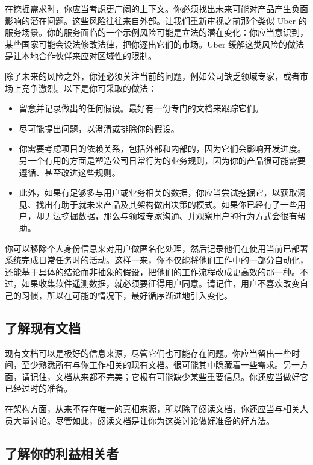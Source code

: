 \label{idx:165}
在挖掘需求时，你应当考虑更广阔的上下文。你必须找出未来可能对产品产生负面影响的潜在问题。这些风险往往来自外部。让我们重新审视之前那个类似 Uber 的服务场景。你的服务面临的一个示例风险可能是立法的潜在变化：你应当意识到，某些国家可能会设法修改法律，把你逐出它们的市场。Uber 缓解这类风险的做法是让本地合作伙伴来应对区域性的限制。

除了未来的风险之外，你还必须关注当前的问题，例如公司缺乏领域专家，或者市场上竞争激烈。以下是你可采取的做法：

\begin{itemize}
\item 留意并记录做出的任何假设。最好有一份专门的文档来跟踪它们。
\item 尽可能提出问题，以澄清或排除你的假设。
\item 你需要考虑项目的依赖关系，包括外部和内部的，因为它们会影响开发进度。另一个有用的方面是塑造公司日常行为的业务规则，因为你的产品很可能需要遵循、甚至改进这些规则。
\item 此外，如果有足够多与用户或业务相关的数据，你应当尝试挖掘它，以获取洞见、找出有助于就未来产品及其架构做出决策的模式。如果你已经有了一些用户，却无法挖掘数据，那么与领域专家沟通、并观察用户的行为方式会很有帮助。
\end{itemize}

你可以移除个人身份信息来对用户做匿名化处理，然后记录他们在使用当前已部署系统完成日常任务时的活动。这样一来，你不仅能将他们工作中的一部分自动化，还能基于具体的结论而非抽象的假设，把他们的工作流程改成更高效的那一种。不过，如果收集软件遥测数据，就必须要征得用户同意。请记住，用户不喜欢改变自己的习惯，所以在可能的情况下，最好循序渐进地引入变化。

\subsection{了解现有文档}

\label{idx:166}
现有文档可以是极好的信息来源，尽管它们也可能存在问题。你应当留出一些时间，至少熟悉所有与你工作相关的现有文档。很可能其中隐藏着一些需求。另一方面，请记住，文档从来都不完美；它极有可能缺少某些重要信息。你还应当做好它已经过时的准备。

在架构方面，从来不存在唯一的真相来源，所以除了阅读文档，你还应当与相关人员大量讨论。尽管如此，阅读文档是让你为这类讨论做好准备的好方法。

\subsection{了解你的利益相关者}

